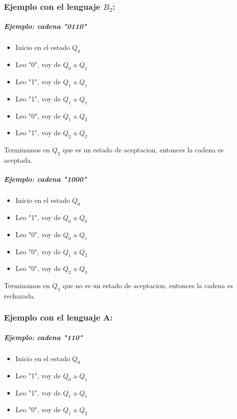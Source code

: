 \documentclass[a4paper, 12pt]{article}
\begin{document}
\subsubsection*{Ejemplo con el lenguaje \( B_2 \):}
\subparagraph{Ejemplo: cadena "0110"}

\begin{itemize}
    \item  Inicio en el estado \( Q_0 \)
    \item  Leo "0", voy de \( Q_0 \) a \( Q_1 \)
    \item  Leo "1", voy de \( Q_1 \) a \( Q_1 \)
    \item  Leo "1", voy de \( Q_1 \) a \( Q_1 \)
    \item  Leo "0", voy de \( Q_1 \) a \( Q_2 \)
    \item  Leo "1", voy de \( Q_2 \) a \( Q_2 \)
\end{itemize}

\space
    Terminamos en \( Q_2 \) que es un estado de aceptacion, entonces la cadena es aceptada.

\subparagraph{Ejemplo: cadena "1000"}
\begin{itemize}
    \item  Inicio en el estado \( Q_0 \)
    \item  Leo "1", voy de \( Q_0 \) a \( Q_0 \)
    \item  Leo "0", voy de \( Q_0 \) a \( Q_1 \)
    \item  Leo "0", voy de \( Q_1 \) a \( Q_2 \)
    \item  Leo "0", voy de \( Q_2 \) a \( Q_3 \)
\end{itemize}

\space
    Terminamos en \( Q_3 \) que no es un estado de aceptacion, entonces la cadena es rechazada.




\subsubsection*{Ejemplo con el lenguaje A:}
\subparagraph{Ejemplo: cadena "110"}
\begin{itemize}
    \item  Inicio en el estado \( Q_0 \)
    \item  Leo "1", voy de \( Q_0 \) a \( Q_1 \)
    \item  Leo "1", voy de \( Q_1 \) a \( Q_1 \)
    \item  Leo "0", voy de \( Q_1 \) a \( Q_2 \)
\end{itemize}
\end{document}
